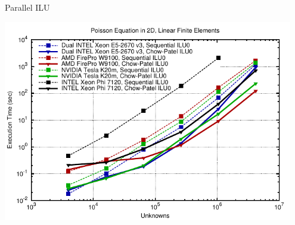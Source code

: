 \documentclass[usepdftitle=false,handout,10pt]{beamer}
\begin{document}
% 
% 
% 

\begin{frame}{Parallel ILU}
  \begin{center}
    \includegraphics[width=0.95\textwidth]{ilu-2d-4}
  \end{center}
\end{frame}




\end{document}
